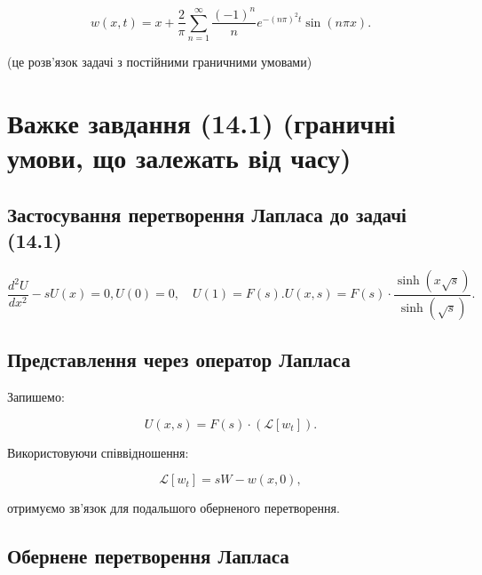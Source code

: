 \documentclass[
  ukrainian,
]{article}
\begin{document}
\[
w(x, t) = x + \frac{2}{\pi} \sum_{n=1}^{\infty} \frac{(-1)^n}{n} e^{-(n\pi)^2 t} \sin(n\pi x).
\]

(це розв'язок задачі з постійними граничними умовами)

\section{Важке завдання (14.1) (граничні умови, що залежать від
часу)}\label{ux432ux430ux436ux43aux435-ux437ux430ux432ux434ux430ux43dux43dux44f-14.1-ux433ux440ux430ux43dux438ux447ux43dux456-ux443ux43cux43eux432ux438-ux449ux43e-ux437ux430ux43bux435ux436ux430ux442ux44c-ux432ux456ux434-ux447ux430ux441ux443}

\subsection{Застосування перетворення Лапласа до задачі
(14.1)}\label{ux437ux430ux441ux442ux43eux441ux443ux432ux430ux43dux43dux44f-ux43fux435ux440ux435ux442ux432ux43eux440ux435ux43dux43dux44f-ux43bux430ux43fux43bux430ux441ux430-ux434ux43e-ux437ux430ux434ux430ux447ux456-14.1}

\[
\frac{d^2 U}{dx^2} - s U(x) = 0,
U(0) = 0, \quad U(1) = F(s).
U(x, s) = F(s)\cdot \frac{\sinh(x \sqrt{s})}{\sinh(\sqrt{s})}.
\]

\subsection{Представлення через оператор
Лапласа}\label{ux43fux440ux435ux434ux441ux442ux430ux432ux43bux435ux43dux43dux44f-ux447ux435ux440ux435ux437-ux43eux43fux435ux440ux430ux442ux43eux440-ux43bux430ux43fux43bux430ux441ux430}

Запишемо:

\[
U(x, s) = F(s) \cdot \left( \mathcal{L}[w_t] \right).
\]

Використовуючи співвідношення:

\[
\mathcal{L}[w_t] = s W - w(x, 0),
\]

отримуємо зв'язок для подальшого оберненого перетворення.

\subsection{Обернене перетворення
Лапласа}\label{ux43eux431ux435ux440ux43dux435ux43dux435-ux43fux435ux440ux435ux442ux432ux43eux440ux435ux43dux43dux44f-ux43bux430ux43fux43bux430ux441ux430}
\end{document}

